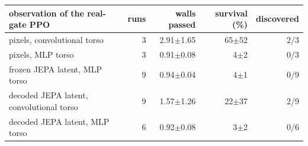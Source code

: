\begin{tabular}{lrrrr}
\toprule
observation of the real-gate PPO & runs & walls passed & survival (\%) & discovered \\
\midrule
pixels, convolutional torso & 3 & 2.91$\pm$1.65 & 65$\pm$52 & 2/3 \\
pixels, MLP torso & 3 & 0.91$\pm$0.08 & 4$\pm$2 & 0/3 \\
frozen JEPA latent, MLP torso & 9 & 0.94$\pm$0.04 & 4$\pm$1 & 0/9 \\
decoded JEPA latent, convolutional torso & 9 & 1.57$\pm$1.26 & 22$\pm$37 & 2/9 \\
decoded JEPA latent, MLP torso & 6 & 0.92$\pm$0.08 & 3$\pm$2 & 0/6 \\
\bottomrule
\end{tabular}
